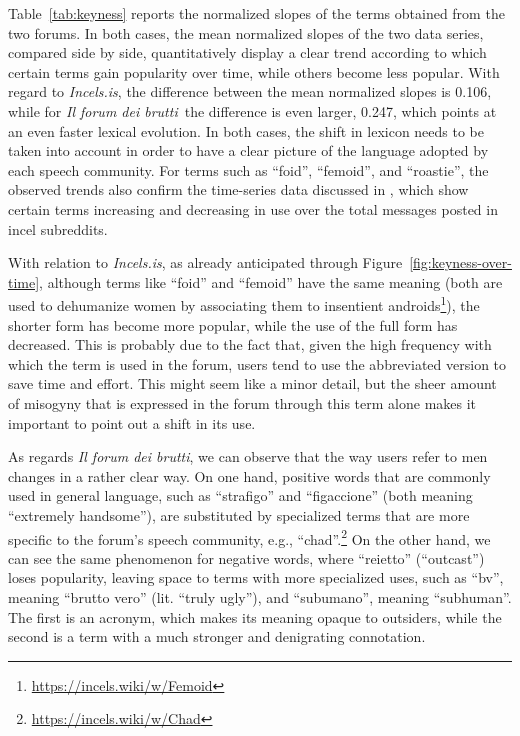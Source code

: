 \documentclass[11pt]{article}
\newcommand{\enforum}{\textit{Incels.is}}
\newcommand{\itforum}{\textit{Il forum dei brutti}}
\begin{document}
Table~\ref{tab:keyness} reports the normalized slopes of the terms obtained from the two forums. In both cases, the mean normalized slopes of the two data series, compared side by side, quantitatively display a clear trend according to which certain terms gain popularity over time, while others become less popular. With regard to \enforum, the difference between the mean normalized slopes is 0.106, while for \itforum\, the difference is even larger, 0.247, which points at an even faster lexical evolution. In both cases, the shift in lexicon needs to be taken into account in order to have a clear picture of the language adopted by each speech community. For terms such as ``foid'', ``femoid'', and ``roastie'', the observed trends also confirm the time-series data discussed in , which show certain terms increasing and decreasing in use over the total messages posted in incel subreddits.

With relation to \enforum, as already anticipated through Figure~\ref{fig:keyness-over-time}, although terms like ``foid'' and ``femoid'' have the same meaning (both are used to dehumanize women by associating them to insentient androids\footnote{\url{https://incels.wiki/w/Femoid}}), the shorter form has become more popular, while the use of the full form has decreased. This is probably due to the fact that, given the high frequency with which the term is used in the forum, users tend to use the abbreviated version to save time and effort. This might seem like a minor detail, but the sheer amount of misogyny that is expressed in the forum through this term alone makes it important to point out a shift in its use.

As regards \itforum, we can observe that the way users refer to men changes in a rather clear way. On one hand, positive words that are commonly used in general language, such as ``strafigo'' and ``figaccione'' (both meaning ``extremely handsome''), are substituted by specialized terms that are more specific to the forum's speech community, e.g., ``chad''.\footnote{\url{https://incels.wiki/w/Chad}} On the other hand, we can see the same phenomenon for negative words, where ``reietto'' (``outcast'') loses popularity, leaving space to terms with more specialized uses, such as ``bv'', meaning ``brutto vero'' (lit. ``truly ugly''), and ``subumano'', meaning ``subhuman''. The first is an acronym, which makes its meaning opaque to outsiders, while the second is a term with a much stronger and denigrating connotation.
\end{document}
